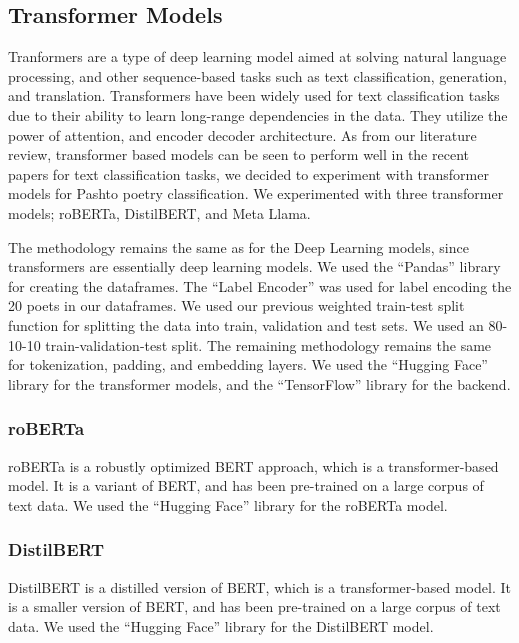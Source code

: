 \subsection{Transformer Models}

Tranformers are a type of deep learning model aimed at solving natural language processing, and other sequence-based tasks such as text classification, generation, and translation. Transformers have been widely used for text classification tasks due to their ability to learn long-range dependencies in the data. They utilize the power of attention, and encoder decoder architecture. As from our literature review, transformer based models can be seen to perform well in the recent papers for text classification tasks, we decided to experiment with transformer models for Pashto poetry classification. We experimented with three transformer models; roBERTa, DistilBERT, and Meta Llama. 

The methodology remains the same as for the Deep Learning models, since transformers are essentially deep learning models. We used the ``Pandas'' library for creating the dataframes. The ``Label Encoder'' was used for label encoding the 20 poets in our dataframes. We used our previous weighted train-test split function for splitting the data into train, validation and test sets. We used an 80-10-10 train-validation-test split. The remaining methodology remains the same for tokenization, padding, and embedding layers. We used the ``Hugging Face'' library for the transformer models, and the ``TensorFlow'' library for the backend. 


\subsubsection{roBERTa}
roBERTa is a robustly optimized BERT approach, which is a transformer-based model. It is a variant of BERT, and has been pre-trained on a large corpus of text data. We used the ``Hugging Face'' library for the roBERTa model.


\subsubsection{DistilBERT}
DistilBERT is a distilled version of BERT, which is a transformer-based model. It is a smaller version of BERT, and has been pre-trained on a large corpus of text data. We used the ``Hugging Face'' library for the DistilBERT model. 


